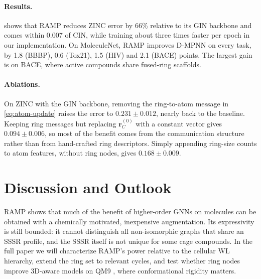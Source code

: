 \documentclass[11pt]{article}
\newcommand{\rr}{\mathbf{r}}
\begin{document}
\paragraph{Results.}  shows that RAMP reduces ZINC error by 66\% relative to its GIN backbone and comes within 0.007 of CIN, while training about three times faster per epoch in our implementation. On MoleculeNet, RAMP improves D-MPNN on every task, by 1.8 (BBBP), 0.6 (Tox21), 1.5 (HIV) and 2.1 (BACE) points. The largest gain is on BACE, where active compounds share fused-ring scaffolds.

\paragraph{Ablations.} On ZINC with the GIN backbone, removing the ring-to-atom message in \eqref{eq:atom-update} raises the error to $0.231 \pm 0.012$, nearly back to the baseline. Keeping ring messages but replacing $\rr_C^{(0)}$ with a constant vector gives $0.094 \pm 0.006$, so most of the benefit comes from the communication structure rather than from hand-crafted ring descriptors. Simply appending ring-size counts to atom features, without ring nodes, gives $0.168 \pm 0.009$.

\section{Discussion and Outlook}

RAMP shows that much of the benefit of higher-order GNNs on molecules can be obtained with a chemically motivated, inexpensive augmentation. Its expressivity is still bounded: it cannot distinguish all non-isomorphic graphs that share an SSSR profile, and the SSSR itself is not unique for some cage compounds. In the full paper we will characterize RAMP's power relative to the cellular WL hierarchy, extend the ring set to relevant cycles, and test whether ring nodes improve 3D-aware models on QM9 \cite{ramakrishnan2014}, where conformational rigidity matters.

\small


\end{document}
